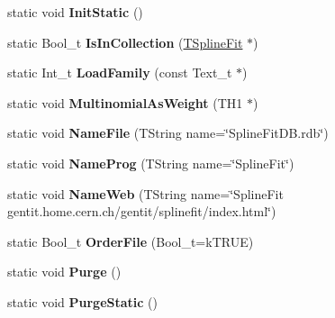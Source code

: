 \begin{DoxyCompactItemize}
\item 
\hypertarget{classTSplineFit_ada431d4da095561f633e379c59ef7983}{
static void {\bfseries InitStatic} ()}
\label{classTSplineFit_ada431d4da095561f633e379c59ef7983}

\item 
\hypertarget{classTSplineFit_a9bbf2fa147890d5358ef0285973cac0c}{
static Bool\_\-t {\bfseries IsInCollection} (\hyperlink{classTSplineFit}{TSplineFit} $\ast$)}
\label{classTSplineFit_a9bbf2fa147890d5358ef0285973cac0c}

\item 
\hypertarget{classTSplineFit_a98e8b5fc5043939a37df2f63e367213a}{
static Int\_\-t {\bfseries LoadFamily} (const Text\_\-t $\ast$)}
\label{classTSplineFit_a98e8b5fc5043939a37df2f63e367213a}

\item 
\hypertarget{classTSplineFit_ab78111a31ce7b4c5b4b34eb305ac35eb}{
static void {\bfseries MultinomialAsWeight} (TH1 $\ast$)}
\label{classTSplineFit_ab78111a31ce7b4c5b4b34eb305ac35eb}

\item 
\hypertarget{classTSplineFit_aff5e5267f2a6af013b3937d018279312}{
static void {\bfseries NameFile} (TString name=\char`\"{}SplineFitDB.rdb\char`\"{})}
\label{classTSplineFit_aff5e5267f2a6af013b3937d018279312}

\item 
\hypertarget{classTSplineFit_a6e39730e4501eed5ba6c4f4a3dad575b}{
static void {\bfseries NameProg} (TString name=\char`\"{}SplineFit\char`\"{})}
\label{classTSplineFit_a6e39730e4501eed5ba6c4f4a3dad575b}

\item 
\hypertarget{classTSplineFit_aeedb260fde600b46dd1f3a914c206d5b}{
static void {\bfseries NameWeb} (TString name=\char`\"{}SplineFit gentit.home.cern.ch/gentit/splinefit/index.html\char`\"{})}
\label{classTSplineFit_aeedb260fde600b46dd1f3a914c206d5b}

\item 
\hypertarget{classTSplineFit_acdea4f76798011130bebc1c0cfcd790f}{
static Bool\_\-t {\bfseries OrderFile} (Bool\_\-t=kTRUE)}
\label{classTSplineFit_acdea4f76798011130bebc1c0cfcd790f}

\item 
\hypertarget{classTSplineFit_af76406e7b7af7aad6a9e75912f869a1c}{
static void {\bfseries Purge} ()}
\label{classTSplineFit_af76406e7b7af7aad6a9e75912f869a1c}

\item 
\hypertarget{classTSplineFit_a9e5ef2acb681004c6193c4a8c39ccef4}{
static void {\bfseries PurgeStatic} ()}
\label{classTSplineFit_a9e5ef2acb681004c6193c4a8c39ccef4}


\end{DoxyCompactItemize}
